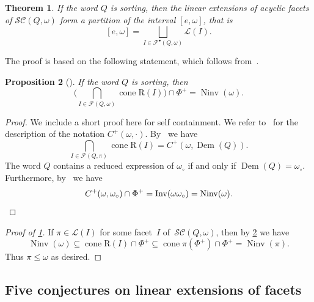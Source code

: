 \documentclass[reqno]{amsart}
\newtheorem{theorem}{Theorem}[section]
\newtheorem{proposition}[theorem]{Proposition}
\theoremstyle{definition}
\DeclareMathOperator{\cone}{cone} %
\DeclareMathOperator{\Inv}{Inv} %
\DeclareMathOperator{\Ninv}{Ninv} %
\DeclareMathOperator{\DemazureProduct}{Dem} %
\newcommand{\linearExtensions}{\mathcal{L}} %
\newcommand{\wo}{\omega_\circ} %
\newcommand{\subwordComplex}{\mathcal{SC}} %
\newcommand{\Roots}{\mathrm{R}} %
\newcommand{\subwordFacets}{\mathcal{F}} %
\newcommand{\subwordAcyclicFacets}{\mathcal{F}^\bullet} %
\begin{document}
\begin{theorem}
\label{thm:linearExtensionsPartitionSubwordComplexB}
If the word $Q$ is sorting, then the linear extensions of acyclic facets of $\subwordComplex(Q,\omega)$ form a partition of the interval $[e,\omega]$, that is
\[
[e,\omega] = \bigsqcup_{I\in\subwordAcyclicFacets(Q,\omega)} \linearExtensions(I).
\]
\end{theorem}

The proof is based on the following statement, which follows from~\cite[Thm.~3.1 \& Coro.~3.3]{JahnStump}.

\begin{proposition}[{\cite{JahnStump}}]
\label{prop:intersectionRootConfigurations}
If the word $Q$ is sorting, then 
\[
\Big( \bigcap_{I\in \subwordFacets(Q,\omega)} \cone \Roots(I) \Big) \cap \Phi^+ = \Ninv(\omega).
\]
\end{proposition}

\begin{proof}
We include a short proof here for self containment.
We refer to~\cite{JahnStump} for the description of the notation $C^+(\omega,\cdot)$.
By~\cite[Theorem~3.1]{JahnStump} we have
\[
\bigcap_{I\in \subwordFacets(Q,\pi)} \cone \Roots(I) = C^+(\omega,\DemazureProduct(Q)).
\]
The word $Q$ contains a reduced expression of $\wo$ if and only if $\DemazureProduct(Q)=\wo$.
Furthermore, by~\cite[Corollary~3.3]{JahnStump} we have
\[
C^+(\omega,\wo)\cap \Phi^+ = \Inv(\omega \wo) = \Ninv(\omega).
\qedhere
\]
\end{proof}

\begin{proof}[Proof of \cref{thm:linearExtensionsPartitionSubwordComplexB}]
If $\pi \in \linearExtensions(I)$ for some facet~$I$ of~$\subwordComplex(Q, \omega)$, then by \cref{prop:intersectionRootConfigurations} we have 
\[
\Ninv(\omega) \subseteq \cone \Roots(I) \cap \Phi^+ \subseteq \cone \pi(\Phi^+) \cap \Phi^+  = \Ninv(\pi).
\]
Thus $\pi \le \omega$ as desired.
\end{proof}


\subsection{Five conjectures on linear extensions of facets}
\label{subsec:fiveConjectures}
\end{document}
